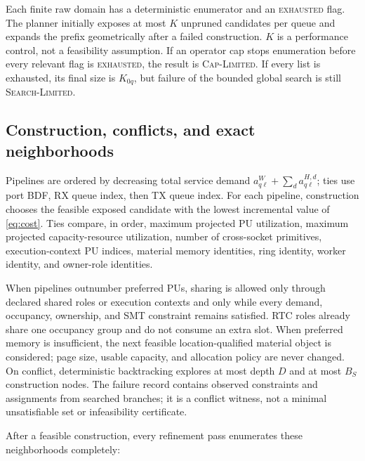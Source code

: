 Each finite raw domain has a deterministic enumerator and an \textsc{exhausted} flag. The planner initially exposes at most $K$ unpruned candidates per queue and expands the prefix geometrically after a failed construction. $K$ is a performance control, not a feasibility assumption. If an operator cap stops enumeration before every relevant flag is \textsc{exhausted}, the result is \textsc{Cap-Limited}. If every list is exhausted, its final size is $K_{0q}$, but failure of the bounded global search is still \textsc{Search-Limited}.

\subsection{Construction, conflicts, and exact neighborhoods}

Pipelines are ordered by decreasing total service demand
$a^W_{q\ell}+\sum_d a^{H,d}_{q\ell}$; ties use port BDF, RX queue index, then TX queue index. For each pipeline, construction chooses the feasible exposed candidate with the lowest incremental value of \cref{eq:cost}. Ties compare, in order, maximum projected PU utilization, maximum projected capacity-resource utilization, number of cross-socket primitives, execution-context PU indices, material memory identities, ring identity, worker identity, and owner-role identities.

When pipelines outnumber preferred PUs, sharing is allowed only through declared shared roles or execution contexts and only while every demand, occupancy, ownership, and SMT constraint remains satisfied. RTC roles already share one occupancy group and do not consume an extra slot. When preferred memory is insufficient, the next feasible location-qualified material object is considered; page size, usable capacity, and allocation policy are never changed. On conflict, deterministic backtracking explores at most depth $D$ and at most $B_S$ construction nodes. The failure record contains observed constraints and assignments from searched branches; it is a conflict witness, not a minimal unsatisfiable set or infeasibility certificate.

After a feasible construction, every refinement pass enumerates these neighborhoods completely:

